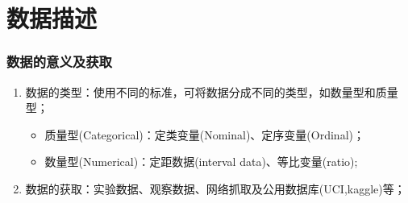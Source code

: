 \documentclass[
]{book}
\providecommand{\tightlist}{%
  \setlength{\itemsep}{0pt}\setlength{\parskip}{0pt}}
\begin{document}
\hypertarget{ux6570ux636eux63cfux8ff0}{%
\chapter{数据描述}\label{ux6570ux636eux63cfux8ff0}}

\hypertarget{ux6570ux636eux7684ux610fux4e49ux53caux83b7ux53d6}{%
\subsection{数据的意义及获取}\label{ux6570ux636eux7684ux610fux4e49ux53caux83b7ux53d6}}

\begin{enumerate}
\def\labelenumi{\arabic{enumi}.}
\tightlist
\item
  数据的类型：使用不同的标准，可将数据分成不同的类型，如数量型和质量型；

  \begin{itemize}
  \tightlist
  \item
    质量型(Categorical)：定类变量(Nominal)、定序变量(Ordinal)；
  \item
    数量型(Numerical)：定距数据(interval data)、等比变量(ratio);
  \end{itemize}
\item
  数据的获取：实验数据、观察数据、网络抓取及公用数据库(UCI,kaggle)等；


\end{enumerate}
\end{document}
